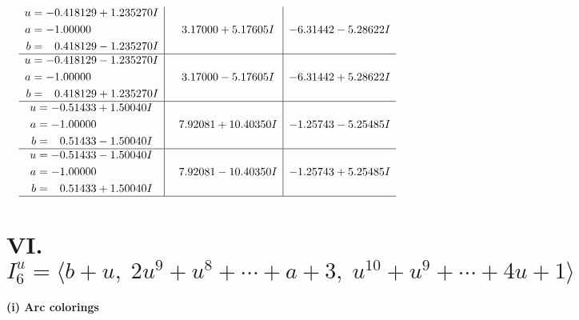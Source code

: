 \documentclass[1p]{elsarticle_modified}
\theoremstyle{definition}
\begin{document}
$$\begin{array}{c|c|c}
\begin{aligned}
u &= -0.418129 + 1.235270 I \\
a &= -1.00000\phantom{ +0.000000I} \\
b &= \phantom{-}0.418129 - 1.235270 I\end{aligned}
 & \phantom{-}3.17000 + 5.17605 I & -6.31442 - 5.28622 I \\ \hline\begin{aligned}
u &= -0.418129 - 1.235270 I \\
a &= -1.00000\phantom{ +0.000000I} \\
b &= \phantom{-}0.418129 + 1.235270 I\end{aligned}
 & \phantom{-}3.17000 - 5.17605 I & -6.31442 + 5.28622 I \\ \hline\begin{aligned}
u &= -0.51433 + 1.50040 I \\
a &= -1.00000\phantom{ +0.000000I} \\
b &= \phantom{-}0.51433 - 1.50040 I\end{aligned}
 & \phantom{-}7.92081 + 10.40350 I & -1.25743 - 5.25485 I \\ \hline\begin{aligned}
u &= -0.51433 - 1.50040 I \\
a &= -1.00000\phantom{ +0.000000I} \\
b &= \phantom{-}0.51433 + 1.50040 I\end{aligned}
 & \phantom{-}7.92081 - 10.40350 I & -1.25743 + 5.25485 I\\
 \hline 
 \end{array}$$\newpage\newpage\renewcommand{\arraystretch}{1}
\centering \section*{VI. $I^u_{6}= \langle b+u,\;2 u^9+u^8+\cdots+a+3,\;u^{10}+u^9+\cdots+4 u+1 \rangle$}
\flushleft \textbf{(i) Arc colorings}\\
\end{document}

